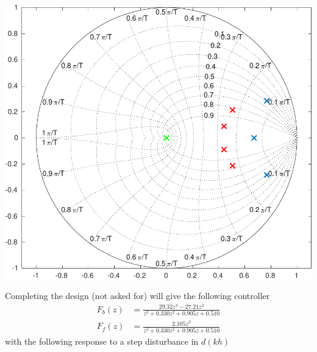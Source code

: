 \documentclass[letterpaper,12pt]{scrartcl}
\newenvironment{exercise}[1][Problem]{\begin{trivlist} \item[\hskip
    \labelsep {\stepcounter{exerctr}\bfseries #1
      \arabic{exerctr}}]}{\end{trivlist}\vspace{10mm}}
\newcounter{exerctr}
\begin{document}
\begin{exercise}
\begin{center}
\includegraphics[width=0.5\linewidth]{../../matlab/abs-desired-poles-crop}
\end{center}

Completing the design (not asked for) will give the following controller
\begin{align*}
  F_b(z) &= \frac{29.32 z^3 - 27.21z^2}{z^3 + 0.330z^2 + 0.905z + 0.510}\\
  F_f(z) &= \frac{2.105z^3}{z^3 + 0.330z^2 + 0.905z + 0.510}
\end{align*}
with the following response to a step disturbance in $d(kh)$
  \begin{center}
  \end{center}

\end{exercise}
\end{document}
